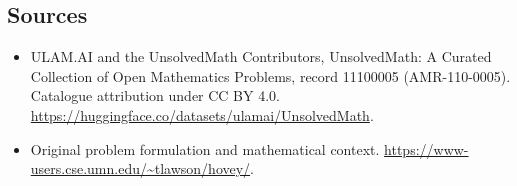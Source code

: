 \documentclass[11pt]{article}
\begin{document}
\subsection{Sources}
\begin{itemize}
\item[\hypertarget{source:11100005:1}{S1}] ULAM.AI and the UnsolvedMath Contributors, UnsolvedMath: A Curated Collection of Open Mathematics Problems, record 11100005 (AMR-110-0005). Catalogue attribution under CC BY 4.0.
\url{https://huggingface.co/datasets/ulamai/UnsolvedMath}.
\item[\hypertarget{source:11100005:2}{S2}] Original problem formulation and mathematical context.
\url{https://www-users.cse.umn.edu/~tlawson/hovey/}.
\end{itemize}
\label{end:11100005}
\end{document}
